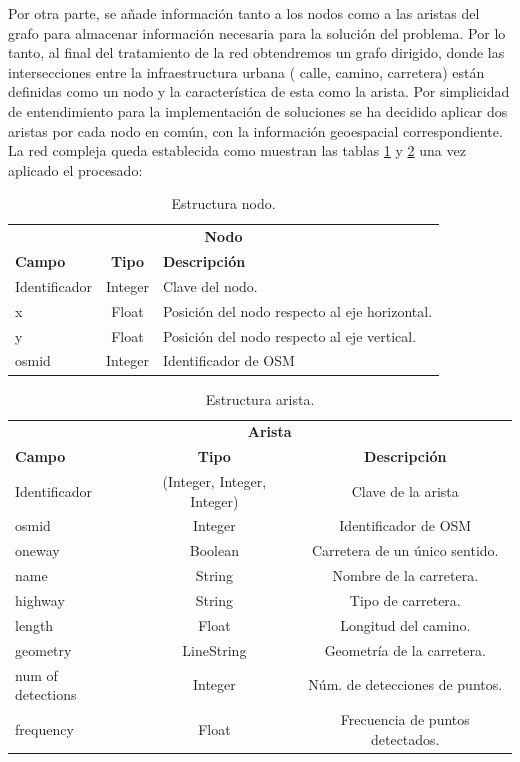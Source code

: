 Por otra parte, se añade información tanto a los nodos como a las aristas del grafo para 
almacenar información necesaria para la solución del problema. Por lo tanto, al final del tratamiento 
de la red obtendremos un grafo dirigido, donde las intersecciones entre la infraestructura urbana (
calle, camino, carretera) están definidas como un nodo y la característica de esta como la arista. Por 
simplicidad de entendimiento para la implementación de soluciones se ha decidido aplicar dos 
aristas por cada nodo en común, con la información geoespacial correspondiente. La red 
compleja queda establecida como muestran las tablas \ref{TablaNodo} y \ref{TablaArista} una vez aplicado el procesado:
\begin{table}[h]
\centering
\begin{tabular}{l | c | l} 
\toprule
\multicolumn{3}{c}{\textbf{Nodo}} \\ 
\cmidrule(r){1-3}
{\textbf{Campo}} &  {\textbf{Tipo}} & {\textbf{Descripción}} \\
\cmidrule(r){1-3}
{Identificador}  & Integer  & Clave del nodo.\\
{x}  & Float & Posición del nodo respecto al eje horizontal. \\
{y}  & Float & Posición del nodo respecto al eje vertical.\\
{osmid} & Integer & Identificador de \ac{OSM} \\
\bottomrule
\end{tabular}
\caption{Estructura nodo.}
\label{TablaNodo}
\end{table}
\begin{table}[h]
\centering
\begin{tabular}{l | c | c } 
\toprule
\multicolumn{2}{r}{\textbf{Arista}} \\ 
\cmidrule(r){1-3}
{\textbf{Campo}} &  {\textbf{Tipo}} & {\textbf{Descripción}} \\
\cmidrule(r){1-3}
{Identificador}  & (Integer, Integer, Integer)  & {Clave de la arista}\\
{osmid}  & Integer  & Identificador de \ac{OSM} \\
{oneway} &  Boolean & Carretera de un único sentido. \\
{name} & String & Nombre de la carretera. \\
{highway} & String & Tipo de carretera. \\
{length} & Float & Longitud del camino. \\
{geometry} & LineString & Geometría de la carretera. \\
{num of detections} & Integer & Núm. de detecciones de puntos. \\
{frequency} & Float & Frecuencia de puntos detectados. \\
\bottomrule
\end{tabular}
\caption{Estructura arista.}
\label{TablaArista}
\end{table}
\newpage

